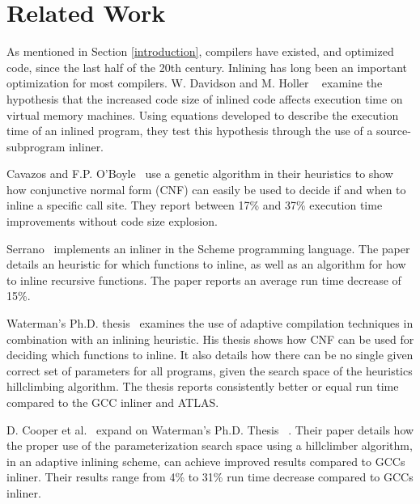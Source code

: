 
\clearpage
\section{Related Work}
\label{sec:related_work}

As mentioned in Section \ref{introduction}, compilers have existed, and
optimized code, since the last half of the 20th century. Inlining has long been
an important optimization for most compilers. W. Davidson and M. Holler
~\cite{SubprogInlining} examine the hypothesis that the increased code size of
inlined code affects execution time on  virtual memory machines.
Using equations developed to describe the execution time of an inlined program,
they test this hypothesis through the use of a source- subprogram
inliner.

Cavazos and F.P. O'Boyle~\cite{AutoTuningJavaHeuristics} use a genetic algorithm
in their  heuristics to show how conjunctive normal form (CNF) can
easily be used to decide if and when to inline a specific call site. They report
between 17\% and 37\% execution time improvements without code size explosion.

Serrano~\cite{InlineWhenHowSerrano} implements an inliner in the Scheme
programming language. The paper details an heuristic for which functions to
inline, as well as an algorithm for how to inline recursive functions. The paper
reports an average run time decrease of 15\%.

Waterman's Ph.D. thesis~\cite{AdaptvCompilAndInlingWaterman} examines the use of
adaptive compilation techniques in combination with an inlining heuristic. His
thesis shows how CNF can be used for deciding which functions to inline. It also
details how there can be no single given correct set of parameters for all
programs, given the search space of the heuristics hillclimbing algorithm. The
thesis reports consistently better or equal run time compared to the GCC inliner
and ATLAS.

D. Cooper et al.~\cite{AdaptvStratInlSubst} expand on Waterman's Ph.D. Thesis
~\cite{AdaptvCompilAndInlingWaterman}. Their paper details how the proper use of
the parameterization search space using a hillclimber algorithm, in an adaptive
inlining scheme, can achieve improved results compared to GCCs inliner. Their
results range from 4\% to 31\% run time decrease compared to GCCs inliner.


